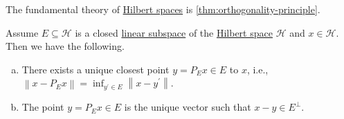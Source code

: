 The fundamental theory of \hyperref[def:Hilbert-space]{Hilbert spaces} is \autoref{thm:orthogonality-principle}.

\begin{theorem}\label{thm:orthogonality-principle}
	Assume \(E\subseteq \mathcal{H} \) is a closed \hyperref[def:linear-vector-space]{linear subspace} of the \hyperref[def:Hilbert-space]{Hilbert space} \(\mathcal{H} \) and \(x\in \mathcal{H} \). Then we have the following.
	\begin{enumerate}[(a)]
		\item There exists a unique closest point \(y = P_E x\in E\) to \(x\), i.e., \(\left\lVert x - P_E x\right\rVert = \inf _{y^\prime \in E} \left\lVert x - y^\prime \right\rVert \).
		\item The point \(y = P_E x\in E\) is the unique vector such that \(x - y\in E^{\perp}\).
	\end{enumerate}
	\begin{center}
	\end{center}
\end{theorem}
